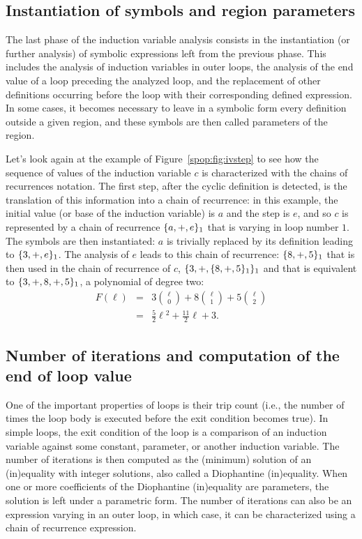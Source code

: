 \subsection{Instantiation of symbols and region parameters}

The last phase of the induction variable analysis consists in the
instantiation (or further analysis) of symbolic expressions left from
the previous phase.  This includes the analysis of induction variables in
outer loops, the analysis of the end value of a loop preceding the
analyzed loop, and the replacement of other definitions occurring before the loop with their corresponding defined expression.  In some
cases, it becomes necessary to leave in a symbolic form every
definition outside a given region, and these symbols are then called
parameters of the region.

Let's look again at the example of Figure~\ref{spop:fig:ivstep} to see
how the sequence of values of the induction variable $c$ is
characterized with the chains of recurrences notation.  The first
step, after the cyclic definition is detected, is the translation of
this information into a chain of recurrence: in this example, the
initial value (or base of the induction variable) is $a$ and the
step is $e$, and so $c$ is represented by a chain of recurrence
$\{a, +, e\}_1$ that is varying in loop number $1$.  The symbols
are then instantiated: $a$ is trivially replaced by its definition
leading to $\{3, +, e\}_1$.  The analysis of $e$ leads to this
chain of recurrence: $\{8, +, 5\}_1$ that is then used in the
chain of recurrence of $c$, $\{3, +, \{8, +, 5\}_1\}_1$ and
that is equivalent to $\{3, +, 8, +, 5\}_1$, a polynomial of
degree two:
\begin{eqnarray*}
  F(\ell)
  &=& 3\binom{\ell}{0} + 8\binom{\ell}{1} + 5\binom{\ell}{2} \\
  &=& \frac{5}{2}\ell{}^2+\frac{11}{2}\ell + 3.
\end{eqnarray*}

\subsection{Number of iterations and computation of the end of loop value}

One of the important properties of loops is their trip count (i.e.,
the number of times the loop body is executed before the exit
condition becomes true).  In simple loops, the exit condition of the
loop is a comparison of an induction variable against some constant,
parameter, or another induction variable.  The number of iterations is
then computed as the (minimum) solution of an (in)equality with integer solutions, also called a Diophantine (in)equality.  When one
or more coefficients of the Diophantine (in)equality are parameters, the
solution is left under a parametric form.  The number of iterations
can also be an expression varying in an outer loop, in which case,
it can be characterized using a chain of recurrence expression.

